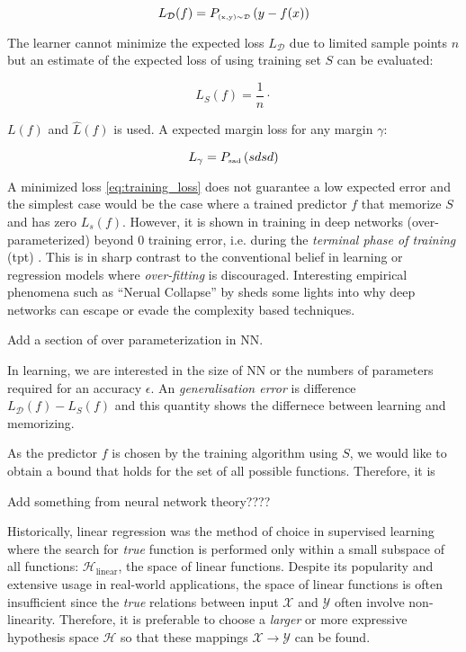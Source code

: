 \begin{equation}
    \label{eq:training_loss}
    L_{\mathcal{D}}(f) = \PRi{(x, y) \sim \mathcal{D}}{y - f(x)}
\end{equation}

The learner cannot minimize the expected loss $L_{\mathcal{D}}$ due to limited
sample points $n$ but an estimate of the expected loss of using training set $S$
can be evaluated:

\begin{equation}
    L_{S}(f) = \frac{1}{n} \cdot
\end{equation}

$L(f)$ and $\hat{L}(f)$ is used. A expected margin loss for any margin $\gamma$:

\begin{equation}
    L_{\gamma} = \PRi{sad}{sdsd}
\end{equation}


A minimized loss \eqref{eq:training_loss} does not guarantee a low expected
error and the simplest case would be the case where a trained predictor $f$ that
memorize $S$ and has zero $L_{s}(f)$. However, it is shown in  training in deep networks (over-parameterized) beyond $0$ training
error, i.e. during the \textit{terminal phase of training} (\Gls{tpt}) \TOCITE.
This is in sharp contrast to the conventional belief in learning or regression
models where \textit{over-fitting} is discouraged. Interesting empirical
phenomena such as ``Nerual Collapse'' by \TOCITE sheds some lights into why deep
networks can escape or evade the complexity based techniques.

Add a section of over parameterization in NN.

In learning, we are interested in the size of NN or the numbers of parameters
required for an accuracy $\epsilon$. An \textit{generalisation error} is
difference $L_\mathcal{D}(f) - L_{S}(f)$ and this quantity shows the differnece between learning and memorizing.

As the predictor $f$ is chosen by the training algorithm using $S$, we would
like to obtain a bound that holds for the set of all possible functions.
Therefore, it is 

Add something from neural network theory????

Historically, linear regression \TOCITE was the method of choice in supervised
learning where the search for \textit{true} function is performed only within a
small subspace of all functions: $\mathcal{H}_{\text{linear}}$, the space of
linear functions. Despite its popularity and extensive usage in real-world
applications, the space of linear functions is often insufficient since the
\textit{true} relations between input $\mathcal{X}$ and $\mathcal{Y}$ often
involve non-linearity. Therefore, it is preferable to choose a \textit{larger}
or more expressive hypothesis space $\mathcal{H}$ so that these mappings
$\mathcal{X} \to \mathcal{Y}$ can be found.

